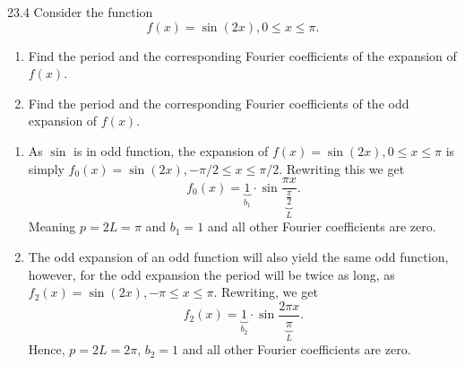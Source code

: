 
\begin{problem}{23.4}
  Consider the function
  \begin{equation*}
    f(x) = \sin(2x), 0 \leq x \leq \pi
  .\end{equation*}
  
  \begin{enumerate}
    \item Find the period and the corresponding Fourier coefficients of the expansion of $f(x)$.
    \item Find the period and the corresponding Fourier coefficients of the odd expansion of $f(x)$.
  \end{enumerate}
\end{problem}

\begin{derivation}
  \begin{enumerate}
    \item As $\sin$ is in odd function, the expansion of $f(x) = \sin (2x), 0 \leq x \leq \pi$ is simply $f_0(x) = \sin(2x), - \pi / 2 \leq x \leq \pi / 2$.
      Rewriting this we get
      \begin{equation*}
        f_0(x) = \underbrace{1}_{b_1} \cdot \sin \frac{\pi x}{\underbrace{\frac{\pi}{2}}_L}
      .\end{equation*}
      Meaning $p = 2L = \pi$ and $b_1 = 1$ and all other Fourier coefficients are zero.
    \item The odd expansion of an odd function will also yield the same odd function, however, for the odd expansion the period will be twice as long, as $f_2 (x) = \sin(2x), - \pi \leq x \leq \pi$.
      Rewriting, we get
      \begin{equation*}
        f_2(x) = \underbrace{1}_{b_2} \cdot \sin \frac{2\pi x}{\underbrace{\pi}_L}
      .\end{equation*}
      Hence, $p = 2L = 2\pi$, $b_2 = 1$ and all other Fourier coefficients are zero.
  \end{enumerate}
\end{derivation}


